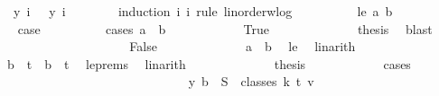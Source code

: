 \begin{isabellebody}
\ {\isachardoublequoteopen}{\isasymchi}\ {\isacharparenleft}{\kern0pt}y\ i{}{\isacharparenright}{\kern0pt}\ {\isacharequal}{\kern0pt}\ {\isasymchi}\ {\isacharparenleft}{\kern0pt}y\ i{}{\isacharparenright}{\kern0pt}{\isachardoublequoteclose}\isanewline
\ \ \ \ \ \ \isamarkupfalse%
\ {\isacharparenleft}{\kern0pt}induction\ i{}\ i{}\ rule{\isacharcolon}{\kern0pt}\ linorder{\isacharunderscore}{\kern0pt}wlog{\isacharparenright}{\kern0pt}\isanewline
\ \ \ \ \ \ \ \ \isamarkupfalse%
\ {\isacharparenleft}{\kern0pt}le\ a\ b{\isacharparenright}{\kern0pt}\isanewline
\ \ \ \ \ \ \ \ \isamarkupfalse%
\ \isamarkupfalse%
\ {\isacharquery}{\kern0pt}case\isanewline
\ \ \ \ \ \ \ \ \isamarkupfalse%
\ {\isacharparenleft}{\kern0pt}cases\ {\isachardoublequoteopen}a\ {\isacharequal}{\kern0pt}\ b{\isachardoublequoteclose}{\isacharparenright}{\kern0pt}\isanewline
\ \ \ \ \ \ \ \ \ \ \isamarkupfalse%
\ True\isanewline
\ \ \ \ \ \ \ \ \ \ \isamarkupfalse%
\ \isamarkupfalse%
\ {\isacharquery}{\kern0pt}thesis\ \isamarkupfalse%
\ blast\isanewline
\ \ \ \ \ \ \ \ \isamarkupfalse%
\isanewline
\ \ \ \ \ \ \ \ \ \ \isamarkupfalse%
\ False\isanewline
\ \ \ \ \ \ \ \ \ \ \isamarkupfalse%
\ \isamarkupfalse%
\ {\isachardoublequoteopen}a\ {\isacharless}{\kern0pt}\ b{\isachardoublequoteclose}\ \isamarkupfalse%
\ le\ \isamarkupfalse%
\ linarith\isanewline
\ \ \ \ \ \ \ \ \ \ \isamarkupfalse%
\ \isamarkupfalse%
\ {\isachardoublequoteopen}b\ {\isacharequal}{\kern0pt}\ t{\isachardoublequoteclose}\ {\isacharbar}{\kern0pt}\ {\isachardoublequoteopen}b\ {\isacharless}{\kern0pt}\ t{\isachardoublequoteclose}\ \isamarkupfalse%
\ le{\isachardot}{\kern0pt}prems{\isacharparenleft}{\kern0pt}{}{\isacharparenright}{\kern0pt}\ \isamarkupfalse%
\ linarith\isanewline
\ \ \ \ \ \ \ \ \ \ \isamarkupfalse%
\ \isamarkupfalse%
\ {\isacharquery}{\kern0pt}thesis\isanewline
\ \ \ \ \ \ \ \ \ \ \isamarkupfalse%
\ cases\isanewline
\ \ \ \ \ \ \ \ \ \ \ \ \isamarkupfalse%
\ {}\isanewline
\ \ \ \ \ \ \ \ \ \ \ \ \isamarkupfalse%
\ \isamarkupfalse%
\ {\isachardoublequoteopen}y\ b\ {\isasymin}\ S\ {\isacharbackquote}{\kern0pt}\ classes\ k\ t\ v{\isachardoublequoteclose}\ \isanewline

\end{isabellebody}
